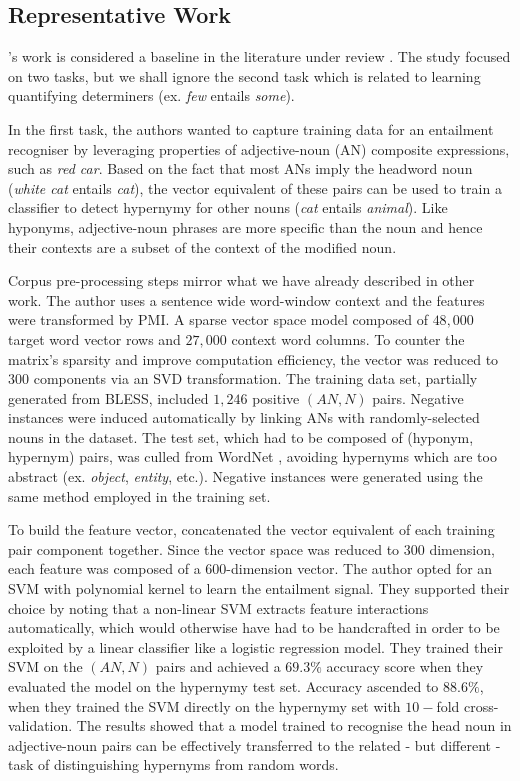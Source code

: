 \subsection{Representative Work} 
\citeauthor{baroni2012entailment}'s work \citep{baroni2012entailment} is considered a baseline in the literature under review \citep{shwartz2017siege, shwartz2016path, camacho2017we, roller2014inclusive, levy2015supervised}.  The study focused on two tasks, but we shall ignore the second task which is related to learning quantifying determiners (ex. \textit{few} entails \textit{some}).  

In the first task, the authors wanted to capture training data for an entailment recogniser by leveraging properties of adjective-noun (AN) composite expressions, such as \textit{red car}.  Based on the fact that most ANs imply the headword noun (\textit{white cat} entails \textit{cat}), the vector equivalent of these pairs can be used to train a classifier to detect hypernymy for other nouns (\textit{cat} entails \textit{animal}).  Like hyponyms, adjective-noun phrases are more specific than the noun and hence their contexts are a subset of the context of the modified noun. 

Corpus pre-processing steps mirror what we have already described in other work.  The author uses a sentence wide word-window context and the features were transformed by \ac{PMI}.  A sparse vector space model composed of $48,000$ target word vector rows and $27,000$ context word columns.  To counter the matrix’s sparsity and improve computation efficiency, the vector was reduced to $300$ components via an \ac{SVD} transformation.  The training data set, partially generated from BLESS, included $1,246$ positive $(AN, N)$ pairs.  Negative instances were induced automatically by linking ANs with randomly-selected nouns in the dataset.  The test set, which had to be composed of (hyponym, hypernym) pairs, was culled from WordNet \citep{Miller1995}, avoiding hypernyms which are too abstract (ex. \textit{object}, \textit{entity}, etc.).  Negative instances were generated using the same method employed in the training set.  

To build the feature vector, \citeauthor{baroni2012entailment} concatenated the vector equivalent of each training pair component together.  Since the vector space was reduced to $300$ dimension, each feature was composed of a $600$-dimension vector.  The author opted for an \ac{SVM} with polynomial kernel to learn the entailment signal.  They supported their choice by noting that a non-linear \ac{SVM} extracts feature interactions automatically, which would otherwise have had to be handcrafted in order to be exploited by a linear classifier like a logistic regression model.  They trained their \ac{SVM} on the $(AN, N)$ pairs and achieved a $69.3\%$ accuracy score when they evaluated the model on the hypernymy test set.  Accuracy ascended to $88.6\%$, when they trained the \ac{SVM} directly on the hypernymy set with $10-$fold cross-validation.  The results showed that a model trained to recognise the head noun in adjective-noun pairs can be effectively transferred to the related - but different - task of distinguishing hypernyms from random words.

